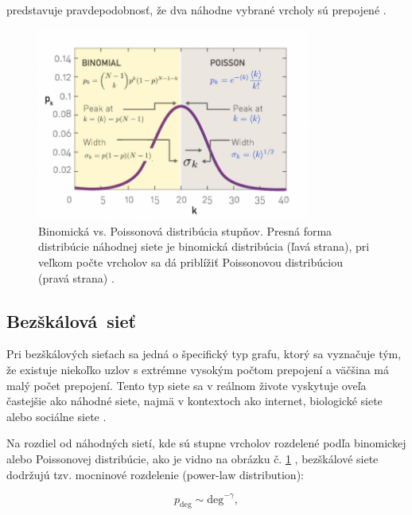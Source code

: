 predstavuje pravdepodobnosť, že dva náhodne vybrané vrcholy sú prepojené \cite{barabasi2016network} .

\begin{figure}
    \centerline{\includegraphics[width=0.8\textwidth]{images/randomdegdist.png}}
    \caption[Binomická vs. Poissonová distribúcia stupňov.]{Binomická vs. Poissonová distribúcia stupňov.
    Presná forma distribúcie náhodnej siete je binomická distribúcia (ľavá strana), pri veľkom počte vrcholov sa
    dá priblížiť Poissonovou distribúciou (pravá strana) \cite{barabasi2016network} .}
    \label{obr:randomdegdist}
\end{figure}

\clearpage

\subsection{Bezškálová~sieť}\label{sec:scale-free-network}

Pri bezškálových sieťach sa jedná o špecifický typ grafu, ktorý sa vyznačuje tým, že existuje niekoľko uzlov
s extrémne vysokým počtom prepojení a väčšina má malý počet prepojení. Tento typ siete sa
v reálnom živote vyskytuje oveľa častejšie ako náhodné siete, najmä v kontextoch ako internet,
biologické siete alebo sociálne siete \cite{barabasi1999emergence} \cite{barabasi2016network} .

Na rozdiel od náhodných sietí, kde sú stupne vrcholov rozdelené podľa binomickej alebo Poissonovej distribúcie, ako je vidno na obrázku č. \ref{obr:randomdegdist} ,
bezškálové siete dodržujú tzv. mocninové rozdelenie (power-law distribution):

\begin{equation}
    p_{\mathrm{deg}} \sim \mathrm{deg}^{-\gamma},
    \label{eq:power_law_distribution_scale_free}
\end{equation}

